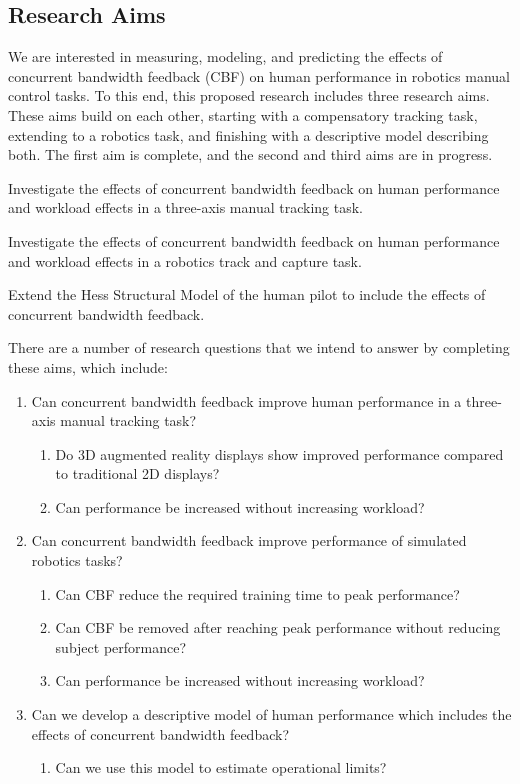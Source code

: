 \subsection{Research Aims}
We are interested in measuring, modeling, and predicting the effects of concurrent bandwidth feedback (CBF) on human performance in robotics manual control tasks.
To this end, this proposed research includes three research aims.
These aims build on each other, starting with a compensatory tracking task, extending to a robotics task, and finishing with a descriptive model describing both.
The first aim is complete, and the second and third aims are in progress.
\begin{description}[align=left]
    \item [Aim One] Investigate the effects of concurrent bandwidth feedback on human performance and workload effects in a three-axis manual tracking task.
    \item [Aim Two] Investigate the effects of concurrent bandwidth feedback on human performance and workload effects in a robotics track and capture task.
    \item [Aim Three] Extend the Hess Structural Model of the human pilot to include the effects of concurrent bandwidth feedback.
\end{description}

There are a number of research questions that we intend to answer by completing these aims, which include:
\begin{enumerate}
    \item Can concurrent bandwidth feedback improve human performance in a three-axis manual tracking task?
          \begin{enumerate}
              \item Do 3D augmented reality displays show improved performance compared to traditional 2D displays?
              \item Can performance be increased without increasing workload?
          \end{enumerate}
    \item Can concurrent bandwidth feedback improve performance of simulated robotics tasks?
          \begin{enumerate}
              \item Can CBF reduce the required training time to peak performance?
              \item Can CBF be removed after reaching peak performance without reducing subject performance?
              \item Can performance be increased without increasing workload?
          \end{enumerate}
    \item Can we develop a descriptive model of human performance which includes the effects of concurrent bandwidth feedback?
          \begin{enumerate}
              \item Can we use this model to estimate operational limits?
          \end{enumerate}
\end{enumerate}

